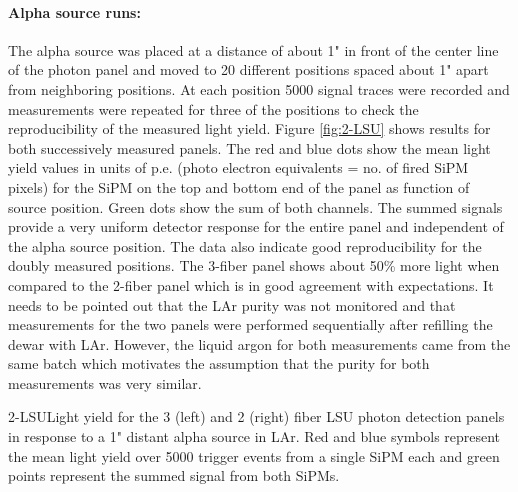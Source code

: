 \paragraph{Alpha source runs:} The alpha source was placed at a distance of about 1" in front of the center line of the photon panel and moved to 20 different positions spaced about 1" apart from neighboring positions. At each position 5000 signal traces were recorded and measurements were repeated for three of the positions to check the reproducibility of the measured light yield. Figure \ref{fig:2-LSU} shows results for both successively measured panels. The red and blue dots show the mean light yield values in units of p.e. (photo electron equivalents = no. of fired SiPM pixels) for the SiPM on the top and bottom end of the panel as function of source position. Green dots show the sum of both channels. The summed signals provide a very uniform detector response for the entire panel and independent of the alpha source position. The data also indicate good reproducibility for the doubly measured positions.
The 3-fiber panel shows about 50\% more light when compared to the
2-fiber panel which is in good agreement with expectations. It needs
to be pointed out that the LAr purity was not monitored and that
measurements for the two panels were performed sequentially after
refilling the dewar with LAr. However, the liquid argon for both
measurements came from the same batch which motivates the assumption
that the purity for both measurements was very similar.

%
\begin{cdrfigure}{2-LSU}{Light yield for the 3 (left) and 2 (right) fiber LSU photon
  detection panels in response to a 1" distant alpha source in
  LAr. Red and blue symbols represent the mean light yield over 5000
  trigger events from a single SiPM each and green points represent
 the summed signal from both SiPMs.}
\end{cdrfigure}

%
